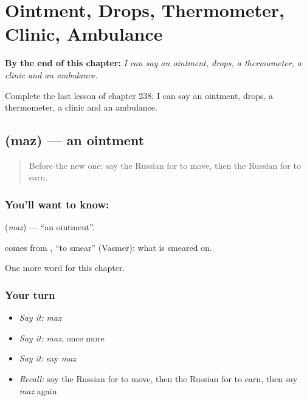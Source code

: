 
\chapter{Ointment, Drops, Thermometer, Clinic, Ambulance}
\label{ch:ru-ointment-drops-thermometer-clinic-ambulance}

\begin{chapteropening}
\textbf{By the end of this chapter:} \emph{I can say an ointment, drops, a thermometer, a clinic and an ambulance.}

Complete the last lesson of chapter 238: I can say an ointment, drops, a thermometer, a clinic and an ambulance.
\end{chapteropening}

\section[\texorpdfstring{\ru{мазь} (maz)}{мазь (maz)}]{ (maz) — an ointment}

\label{lesson:RU-C238-maz}



\begin{quote}
Before the new one: say the Russian for to move, then the Russian for to earn.
\end{quote}

\subsection*{You'll want to know: }
\textbf{} (\emph{maz}) — \textquotedblleft{}an ointment\textquotedblright{}.

\begin{cousinweb}
\textbf{} comes from \emph{}, \textquotedblleft{}to smear\textquotedblright{} (Vasmer): what is smeared on.
\end{cousinweb}

\begin{grammarlens}[title={What you've built}]
One more word for this chapter.
\end{grammarlens}

\subsection*{Your turn}
\begin{itemize}
\raggedright
  \item \emph{Say it:} \emph{maz}
  \item \emph{Say it:} \emph{maz}, once more
  \item \emph{Say it:} say \emph{maz}
  \item \emph{Recall:} say the Russian for to move, then the Russian for to earn, then say \emph{maz} again
\end{itemize}

